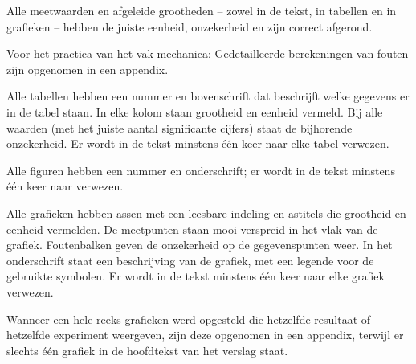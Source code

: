 \begin{checklist}
    \item
        Alle meetwaarden en afgeleide grootheden – zowel in de tekst, in tabellen en in grafieken – hebben de juiste eenheid, onzekerheid en zijn correct afgerond. 
    \item
        Voor het practica van het vak mechanica: Gedetailleerde berekeningen van fouten zijn opgenomen in een appendix.
    \item
        Alle tabellen hebben een nummer en bovenschrift dat beschrijft welke gegevens er in de tabel staan. In elke kolom staan grootheid en eenheid vermeld. Bij alle waarden (met het juiste aantal significante cijfers) staat de bijhorende onzekerheid. Er wordt in de tekst minstens één keer naar elke tabel verwezen.
    \item
        Alle figuren hebben een nummer en onderschrift; er wordt in de tekst minstens één keer naar verwezen.
    \item
        Alle grafieken hebben assen met een leesbare indeling en astitels die grootheid en eenheid vermelden. De meetpunten staan mooi verspreid in het vlak van de grafiek. Foutenbalken geven de onzekerheid op de gegevenspunten weer. In het onderschrift staat een beschrijving van de grafiek, met een legende voor de gebruikte symbolen. Er wordt in de tekst minstens één keer naar elke grafiek verwezen.
    \item
        Wanneer een hele reeks grafieken werd opgesteld die hetzelfde resultaat of hetzelfde experiment weergeven, zijn deze opgenomen in een appendix, terwijl er slechts één grafiek in de hoofdtekst van het verslag staat.
\end{checklist}